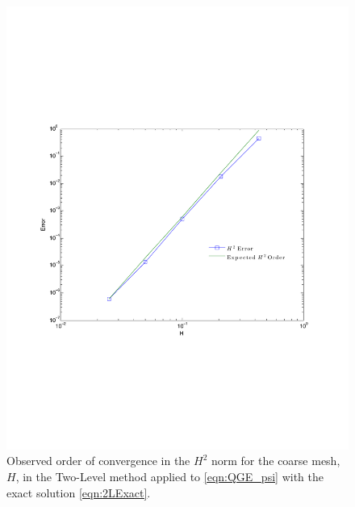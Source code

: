 \begin{figure}
  \begin{center}
    \includegraphics[scale=0.6]{CoarseConvergence.pdf}
    \caption{Observed order of convergence in the $H^2$ norm for the coarse
      mesh, $H$, in the Two-Level method applied to \eqref{eqn:QGE_psi} with the
      exact solution \eqref{eqn:2LExact}.}
  \label{fig:TwoLevelH}
  \end{center}
\end{figure}

